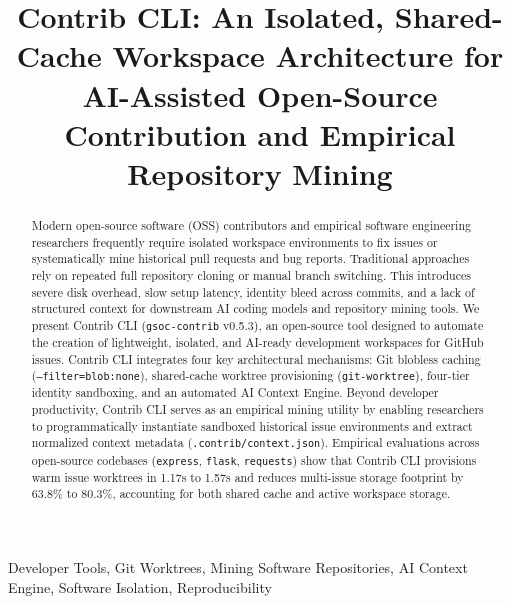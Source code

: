 \documentclass[10pt,conference]{IEEEtran}
\begin{document}
\title{Contrib CLI: An Isolated, Shared-Cache Workspace Architecture for AI-Assisted Open-Source Contribution and Empirical Repository Mining}

\author{
\and
{}
}

\maketitle

\begin{abstract}
Modern open-source software (OSS) contributors and empirical software engineering researchers frequently require isolated workspace environments to fix issues or systematically mine historical pull requests and bug reports. Traditional approaches rely on repeated full repository cloning or manual branch switching. This introduces severe disk overhead, slow setup latency, identity bleed across commits, and a lack of structured context for downstream AI coding models and repository mining tools. We present Contrib CLI (\texttt{gsoc-contrib} v0.5.3), an open-source tool designed to automate the creation of lightweight, isolated, and AI-ready development workspaces for GitHub issues. Contrib CLI integrates four key architectural mechanisms: Git blobless caching (\texttt{--filter=blob:none}), shared-cache worktree provisioning (\texttt{git-worktree}), four-tier identity sandboxing, and an automated AI Context Engine. Beyond developer productivity, Contrib CLI serves as an empirical mining utility by enabling researchers to programmatically instantiate sandboxed historical issue environments and extract normalized context metadata (\texttt{.contrib/context.json}). Empirical evaluations across open-source codebases (\texttt{express}, \texttt{flask}, \texttt{requests}) show that Contrib CLI provisions warm issue worktrees in 1.17s to 1.57s and reduces multi-issue storage footprint by 63.8\% to 80.3\%, accounting for both shared cache and active workspace storage.
\end{abstract}

\begin{IEEEkeywords}
Developer Tools, Git Worktrees, Mining Software Repositories, AI Context Engine, Software Isolation, Reproducibility
\end{IEEEkeywords}
\end{document}
